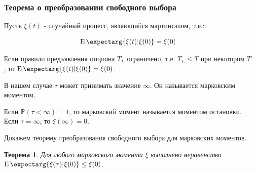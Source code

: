 \documentclass[a4paper,12pt]{article}
\newtheorem{theorem}{Теорема}
\theoremstyle{definition}
\newcommand{\expect}{\operatorname{E}\expectarg}
\begin{document}
\subsubsection{Теорема о преобразовании свободного выбора}

Пусть $\xi (t)$ - случайный процесс, являющийся мартингалом, т.е.:

\begin{equation*}
    \expect{\xi (t)|\xi(0)} = \xi(0)
\end{equation*}

Если правило предъявления опциона $T_L$ ограничено, т.е. $T_L \le T$ при некотором $T$, то $\expect{\xi (t)|\xi(0)} = \xi(0)$.

В нашем случае $\tau$ может принимать значение $\infty$. Он называется марковским моментом.

Если $\mathbb{P} (\tau < \infty) = 1$, то марковский момент называется моментом остановки. Если $\tau = \infty$, то $\xi (\infty) = 0$. 

Докажем теорему преобразования свободного выбора для марковских моментов.

\begin{theorem}
Для любого марковского момента $\xi$ выполнено неравенство $\expect{\xi (\tau) | \xi (0)} \le \xi(0)$. 
\end{theorem}
\end{document}
